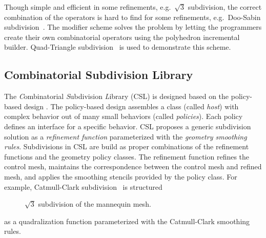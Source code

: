 \documentclass[twocolumn]{article}
\begin{document}
Though simple and efficient in some
refinements, e.g.\ $\sqrt{3}$ subdivision, the correct combination of
the operators is hard to find for some refinements, e.g.\ Doo-Sabin
subdivision~\cite{ds}. The modifier scheme solves the problem by
letting the programmers create their own combinatorial operators 
using the polyhedron incremental builder. Quad-Triangle
subdivision~\cite{qts,l-pg-03} is used to demonstrate this scheme.

\subsection*{Combinatorial Subdivision Library}

The \emph{C}ombinatorial \emph{S}ubdivision \emph{L}ibrary 
(CSL) is designed based on the policy-based design 
\cite{Alexandrescu:2001:MCD}.
The policy-based design assembles a class
(called \emph{host}) with complex behavior out of many 
small behaviors (called \emph{policies}).
Each policy defines an interface for a
specific behavior. CSL proposes a 
generic subdivision solution as a \emph{refinement function}
parameterized with the \emph{geometry smoothing rules}.
Subdivisions in CSL are build as proper combinations of the
refinement functions and the geometry policy classes.
The refinement function refines the control mesh,
maintains the correspondence between the control mesh and refined
mesh, and applies the smoothing stencils provided by the policy
class. For example, Catmull-Clark subdivision~\cite{cc} is structured
\begin{figure}[h]
    \caption{$\sqrt{3}$ subdivision of the mannequin mesh.}
    \label{fig:sqrt3}
    \vspace{0.5cm}
\end{figure}
as a quadralization function parameterized with the Catmull-Clark
smoothing rules.
\end{document}
